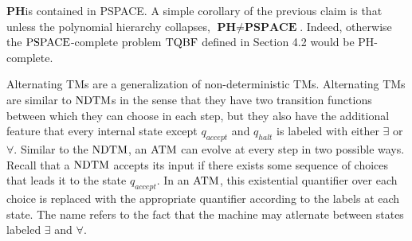 \begin{note}
$\textbf{PH} $is contained in PSPACE.
A simple corollary of the previous claim is that unless the
polynomial hierarchy collapses, $\textbf{PH} \neq \textbf{PSPACE}$.
Indeed, otherwise the $\mathrm{PSPACE}$-complete problem $\mathrm{TQBF}$ defined in
Section 4.2 would be PH-complete.
\end{note}

\begin{note}
Alternating TMs are a generalization of non-deterministic TMs.
Alternating TMs are similar to $\mathrm{NDTM}$s in the sense that they have two
transition functions between which they can choose in each step, but they
also have the additional feature that every internal state except
$q_{accept}$ and $q_{halt}$ is labeled with either $\exists$ or $\forall$.
Similar to the $\mathrm{NDTM}$, an $\mathrm{ATM}$ can evolve at every step in two possible
ways.
Recall that a $\mathrm{NDTM}$ accepts its input if there exists some sequence of
choices that leads it to the state $q_{accept}$.
In an $\mathrm{ATM}$, this existential quantifier over each choice is replaced
with the appropriate quantifier according to the labels at each state.
The name refers to the fact that the machine may atlernate between states
labeled $\exists$ and $\forall$.
\end{note}

